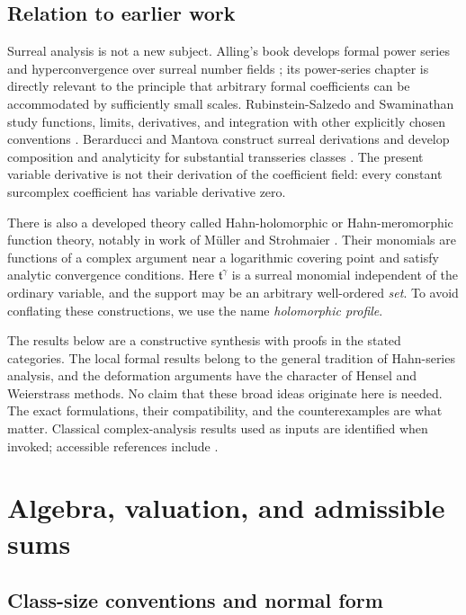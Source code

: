 \documentclass[11pt,a4paper]{article}
\numberwithin{equation}{section}
\theoremstyle{definition}
\newcommand{\tmon}{\mathfrak t}
\begin{document}
\subsection{Relation to earlier work}

Surreal analysis is not a new subject. Alling's book develops formal power
series and hyperconvergence over surreal number fields \cite{Alling}; its
power-series chapter is directly relevant to the principle that arbitrary
formal coefficients can be accommodated by sufficiently small scales.
Rubinstein-Salzedo and Swaminathan study functions, limits, derivatives, and
integration with other explicitly chosen conventions \cite{RSS}.
Berarducci and Mantova construct surreal derivations and develop composition
and analyticity for substantial transseries classes \cite{BMder,BMgerms}.
The present variable derivative is not their derivation of the coefficient
field: every constant surcomplex coefficient has variable derivative zero.

There is also a developed theory called Hahn-holomorphic or Hahn-meromorphic
function theory, notably in work of M\"uller and Strohmaier \cite{MS}. Their
monomials are functions of a complex argument near a logarithmic covering
point and satisfy analytic convergence conditions. Here $\tmon^\gamma$ is a
surreal monomial independent of the ordinary variable, and the support may be
an arbitrary well-ordered \emph{set}. To avoid conflating these constructions,
we use the name \emph{holomorphic profile}.

The results below are a constructive synthesis with proofs in the stated
categories. The local formal results belong to the general tradition of
Hahn-series analysis, and the deformation arguments have the character of
Hensel and Weierstrass methods. No claim that these broad ideas originate here
is needed. The exact formulations, their compatibility, and the counterexamples
are what matter. Classical complex-analysis results used as inputs are
identified when invoked; accessible references include \cite{Orloff,ConwayComplex}.

\section{Algebra, valuation, and admissible sums}

\subsection{Class-size conventions and normal form}
\end{document}
